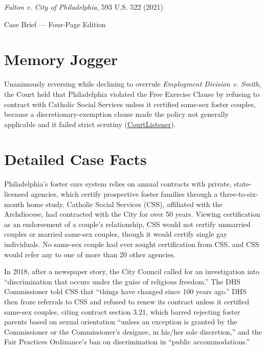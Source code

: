\documentclass[12pt]{article}
\begin{document}
\begin{center}
{\LARGE \textit{Fulton v. City of Philadelphia}, 593 U.S. 522 (2021)\par}
\vspace{0.8em}
{\large Case Brief --- Four-Page Edition\par}
\end{center}
\vspace{1em}

\section{Memory Jogger}

Unanimously reversing while declining to overrule \textit{Employment Division v. Smith}, the Court held that Philadelphia violated the Free Exercise Clause by refusing to contract with Catholic Social Services unless it certified same-sex foster couples, because a discretionary-exemption clause made the policy not generally applicable and it failed strict scrutiny (\href{https://www.courtlistener.com/opinion/4892570/fulton-v-philadelphia/}{CourtListener}).

\section{Detailed Case Facts}

Philadelphia's foster care system relies on annual contracts with private, state-licensed agencies, which certify prospective foster families through a three-to-six-month home study. Catholic Social Services (CSS), affiliated with the Archdiocese, had contracted with the City for over 50 years. Viewing certification as an endorsement of a couple's relationship, CSS would not certify unmarried couples or married same-sex couples, though it would certify single gay individuals. No same-sex couple had ever sought certification from CSS, and CSS would refer any to one of more than 20 other agencies.

In 2018, after a newspaper story, the City Council called for an investigation into ``discrimination that occurs under the guise of religious freedom.'' The DHS Commissioner told CSS that ``things have changed since 100 years ago.'' DHS then froze referrals to CSS and refused to renew its contract unless it certified same-sex couples, citing contract section 3.21, which barred rejecting foster parents based on sexual orientation ``unless an exception is granted by the Commissioner or the Commissioner's designee, in his/her sole discretion,'' and the Fair Practices Ordinance's ban on discrimination in ``public accommodations.''
\end{document}
